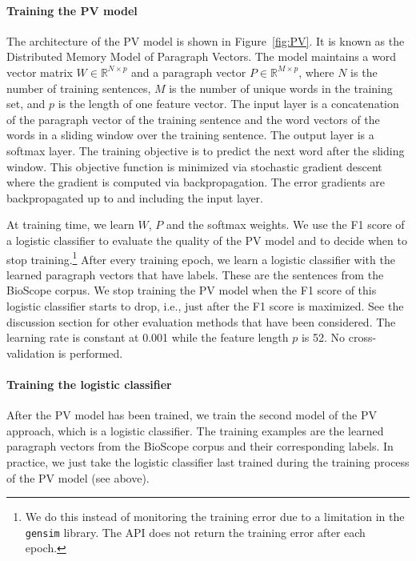\documentclass{article}
\begin{document}
\paragraph{Training the PV model} The architecture of the PV model is shown in Figure~\ref{fig:PV}. It is known as the Distributed Memory Model of Paragraph Vectors. The model maintains a word vector matrix $W \in \mathbb{R}^{N \times p}$ and a paragraph vector $P \in \mathbb{R}^{M \times p}$, where $N$ is the number of training sentences, $M$ is the number of unique words in the training set, and $p$ is the length of one feature vector. The input layer is a concatenation of the paragraph vector of the training sentence and the word vectors of the words in a sliding window over the training sentence. The output layer is a softmax layer. The training objective is to predict the next word after the sliding window. This objective function is minimized via stochastic gradient descent where the gradient is computed via backpropagation. The error gradients are backpropagated up to and including the input layer.

At training time, we learn $W$, $P$ and the softmax weights. We use the F1 score of a logistic classifier to evaluate the quality of the PV model and to decide when to stop training.\footnote{We do this instead of monitoring the training error due to a limitation in the \texttt{gensim} library. The API does not return the training error after each epoch.} After every training epoch, we learn a logistic classifier with the learned paragraph vectors that have labels. These are the sentences from the BioScope corpus. We stop training the PV model when the F1 score of this logistic classifier starts to drop, i.e., just after the F1 score is maximized. See the discussion section for other evaluation methods that have been considered. The learning rate is constant at 0.001 while the feature length $p$ is 52. No cross-validation is performed.

\paragraph{Training the logistic classifier} After the PV model has been trained, we train the second model of the PV approach, which is a logistic classifier. The training examples are the learned paragraph vectors from the BioScope corpus and their corresponding labels. In practice, we just take the logistic classifier last trained during the training process of the PV model (see above).
\end{document}
